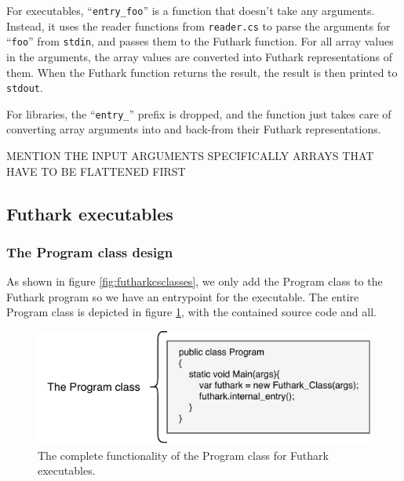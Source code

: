 \begin{description}
For executables, ``\texttt{entry\_foo}'' is a function that doesn't take any
arguments. Instead, it uses the reader functions from \texttt{reader.cs} to parse the
arguments for ``\texttt{foo}'' from \texttt{stdin}, and passes them to the
Futhark function. For all array values in the arguments, the array values are
converted into Futhark representations of them.
When the Futhark function returns the result, the result is then printed to \texttt{stdout}.

For libraries, the ``\texttt{entry\_}'' prefix is dropped, and the function
just takes care of converting array arguments into and back-from their Futhark
representations.

MENTION THE INPUT ARGUMENTS SPECIFICALLY ARRAYS THAT HAVE TO BE FLATTENED FIRST

\clearpage


\subsection{Futhark executables}



\subsubsection{The Program class design}
As shown in figure \ref{fig:futharkcsclasses}, we only add the Program class to
the Futhark program so we have an entrypoint for the executable.
The entire Program class is depicted in figure \ref{fig:programclass}, with the
contained source code and all.

\begin{figure}[H]
  \centering
  \includegraphics{chapters/figs/csharp/program_class.pdf}
  \caption{The complete functionality of the Program class for Futhark
    executables.}
  \label{fig:programclass}
\end{figure}


\end{description}
